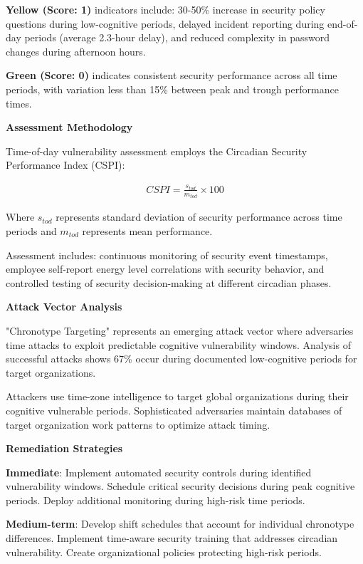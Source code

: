\documentclass[11pt,a4paper]{article}
\begin{document}
\textbf{Yellow (Score: 1)} indicators include: 30-50\% increase in security policy questions during low-cognitive periods, delayed incident reporting during end-of-day periods (average 2.3-hour delay), and reduced complexity in password changes during afternoon hours.

\textbf{Green (Score: 0)} indicates consistent security performance across all time periods, with variation less than 15\% between peak and trough performance times.

\textbf{Assessment Methodology}

Time-of-day vulnerability assessment employs the Circadian Security Performance Index (CSPI):

\begin{align}
CSPI = \frac{s_{tod}}{m_{tod}} \times 100
\end{align}

Where $s_{tod}$ represents standard deviation of security performance across time periods and $m_{tod}$ represents mean performance.

Assessment includes: continuous monitoring of security event timestamps, employee self-report energy level correlations with security behavior, and controlled testing of security decision-making at different circadian phases.

\textbf{Attack Vector Analysis}

"Chronotype Targeting" represents an emerging attack vector where adversaries time attacks to exploit predictable cognitive vulnerability windows. Analysis of successful attacks shows 67\% occur during documented low-cognitive periods for target organizations.

Attackers use time-zone intelligence to target global organizations during their cognitive vulnerable periods. Sophisticated adversaries maintain databases of target organization work patterns to optimize attack timing.

\textbf{Remediation Strategies}

\textbf{Immediate}: Implement automated security controls during identified vulnerability windows. Schedule critical security decisions during peak cognitive periods. Deploy additional monitoring during high-risk time periods.

\textbf{Medium-term}: Develop shift schedules that account for individual chronotype differences. Implement time-aware security training that addresses circadian vulnerability. Create organizational policies protecting high-risk periods.
\end{document}
